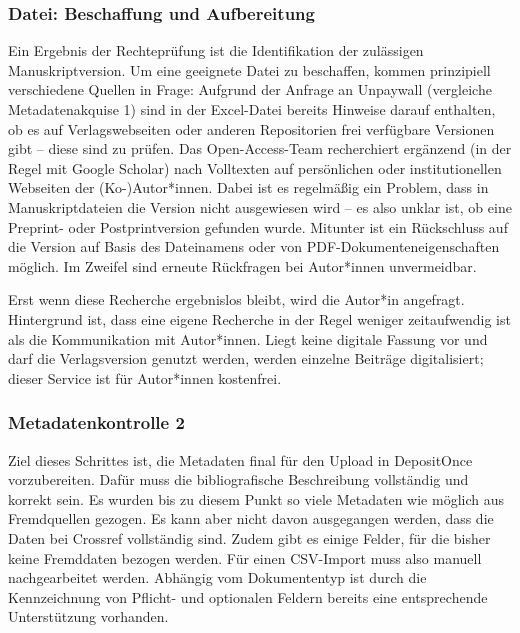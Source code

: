 \documentclass[a4paper,
fontsize=11pt,
oneside,
numbers=noperiodatend,
parskip=half-,
bibliography=totoc,
final
]{scrartcl}
\begin{document}
\hypertarget{datei-beschaffung-und-aufbereitung}{%
\subsubsection{Datei: Beschaffung und
Aufbereitung}\label{datei-beschaffung-und-aufbereitung}}

Ein Ergebnis der Rechteprüfung ist die Identifikation der zulässigen
Manuskriptversion. Um eine geeignete Datei zu beschaffen, kommen
prinzipiell verschiedene Quellen in Frage: Aufgrund der Anfrage an
Unpaywall (vergleiche Metadatenakquise 1) sind in der Excel-Datei
bereits Hinweise darauf enthalten, ob es auf Verlagswebseiten oder
anderen Repositorien frei verfügbare Versionen gibt -- diese sind zu
prüfen. Das Open-Access-Team recherchiert ergänzend (in der Regel mit
Google Scholar) nach Volltexten auf persönlichen oder institutionellen
Webseiten der (Ko-)Autor*innen. Dabei ist es regelmäßig ein Problem,
dass in Manuskriptdateien die Version nicht ausgewiesen wird -- es also
unklar ist, ob eine Preprint- oder Postprintversion gefunden wurde.
Mitunter ist ein Rückschluss auf die Version auf Basis des Dateinamens
oder von PDF-Dokumenteneigenschaften möglich. Im Zweifel sind erneute
Rückfragen bei Autor*innen unvermeidbar.

Erst wenn diese Recherche ergebnislos bleibt, wird die Autor*in
angefragt. Hintergrund ist, dass eine eigene Recherche in der Regel
weniger zeitaufwendig ist als die Kommunikation mit Autor*innen. Liegt
keine digitale Fassung vor und darf die Verlagsversion genutzt werden,
werden einzelne Beiträge digitalisiert; dieser Service ist für
Autor*innen kostenfrei.

\hypertarget{metadatenkontrolle-2}{%
\subsubsection{Metadatenkontrolle 2}\label{metadatenkontrolle-2}}

Ziel dieses Schrittes ist, die Metadaten final für den Upload in
DepositOnce vorzubereiten. Dafür muss die bibliografische Beschreibung
vollständig und korrekt sein. Es wurden bis zu diesem Punkt so viele
Metadaten wie möglich aus Fremdquellen gezogen. Es kann aber nicht davon
ausgegangen werden, dass die Daten bei Crossref vollständig sind. Zudem
gibt es einige Felder, für die bisher keine Fremddaten bezogen werden.
Für einen CSV-Import muss also manuell nachgearbeitet werden. Abhängig
vom Dokumententyp ist durch die Kennzeichnung von Pflicht- und
optionalen Feldern bereits eine entsprechende Unterstützung vorhanden.
\end{document}

